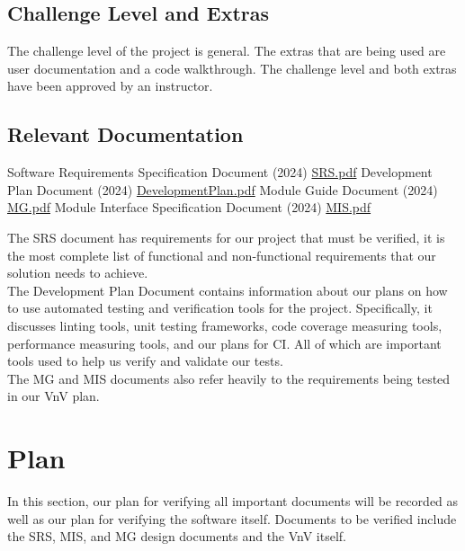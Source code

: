 \documentclass[12pt, titlepage]{article}
\begin{document}
\subsection{Challenge Level and Extras}

The challenge level of the project is general. The extras that are being used
are user documentation and a code walkthrough. The challenge level and both extras
have been approved by an instructor.

\subsection{Relevant Documentation}

\begin{thebibliography}{9}
   Software Requirements Specification Document (2024)
  \href{../SRS-Volere/SRS.pdf}{SRS.pdf}
   Development Plan Document (2024)
  \href{../DevelopmentPlan/DevelopmentPlan.pdf}{DevelopmentPlan.pdf}
   Module Guide Document (2024)
  \href{../Design/SoftArchitecture/MG.pdf}{MG.pdf}
   Module Interface Specification Document (2024)
  \href{../Design/SoftDetailedDes/MIS.pdf}{MIS.pdf}
  \\
\end{thebibliography}

The SRS document has requirements for our project that must be verified, it is
the most complete list of functional and non-functional requirements that our
solution needs to achieve.\\

The Development Plan Document contains information about our plans on how to use 
automated testing and verification tools for the project. Specifically, it discusses
linting tools, unit testing frameworks, code coverage measuring tools, performance
measuring tools, and our plans for CI. All of which are important tools used to 
help us verify and validate our tests.\\

The MG and MIS documents also refer heavily to the requirements being tested
in our VnV plan.

\section{Plan}

In this section, our plan for verifying all important documents will be
recorded as well as our plan for verifying the software itself. Documents to
be verified include the SRS, MIS, and MG design documents and the VnV itself.
\end{document}
